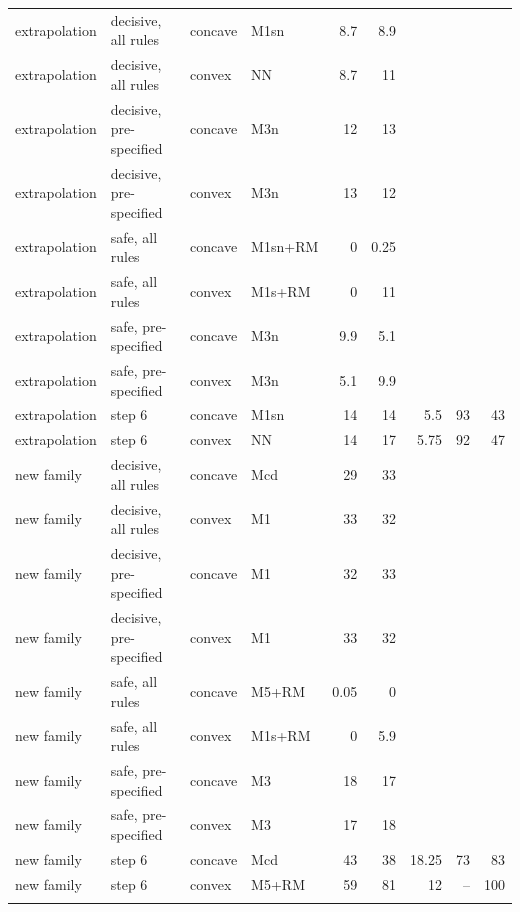 \documentclass[pdflatex,sn-basic]{sn-jnl}
\begin{document}
\begin{table}[p]
\begin{tabular}{@{}llllrrrrr@{}}
extrapolation & decisive, all rules & concave & M1sn & 8.7 & 8.9 & & & \\
extrapolation & decisive, all rules & convex & NN & 8.7 & 11 & & & \\
extrapolation & decisive, pre-specified & concave & M3n & 12 & 13 & & & \\
extrapolation & decisive, pre-specified & convex & M3n & 13 & 12 & & & \\
extrapolation & safe, all rules & concave & M1sn+RM & 0 & 0.25 & & & \\
extrapolation & safe, all rules & convex & M1s+RM & 0 & 11 & & & \\
extrapolation & safe, pre-specified & concave & M3n & 9.9 & 5.1 & & & \\
extrapolation & safe, pre-specified & convex & M3n & 5.1 & 9.9 & & & \\
extrapolation & step 6 & concave & M1sn & 14 & 14 & 5.5 & 93 & 43 \\
extrapolation & step 6 & convex & NN & 14 & 17 & 5.75 & 92 & 47 \\
new family & decisive, all rules & concave & Mcd & 29 & 33 & & & \\
new family & decisive, all rules & convex & M1 & 33 & 32 & & & \\
new family & decisive, pre-specified & concave & M1 & 32 & 33 & & & \\
new family & decisive, pre-specified & convex & M1 & 33 & 32 & & & \\
new family & safe, all rules & concave & M5+RM & 0.05 & 0 & & & \\
new family & safe, all rules & convex & M1s+RM & 0 & 5.9 & & & \\
new family & safe, pre-specified & concave & M3 & 18 & 17 & & & \\
new family & safe, pre-specified & convex & M3 & 17 & 18 & & & \\
new family & step 6 & concave & Mcd & 43 & 38 & 18.25 & 73 & 83 \\
new family & step 6 & convex & M5+RM & 59 & 81 & 12 & -- & 100 \\
\botrule
\end{tabular}
\end{table}
\end{document}
